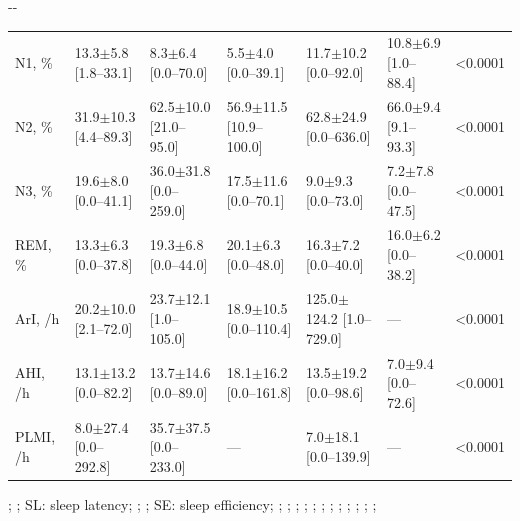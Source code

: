 \begin{landscape}
\begin{table}[tb]
\begin{adjustwidth*}{}{-\marginparwidth-\marginparsep}
\begin{threeparttable}
\begin{tabular}{@{}lllllll@{}}
N1, \%     & 13.3$\pm$5.8 {[}1.8--33.1{]}     & 8.3$\pm$6.4 {[}0.0--70.0{]}      & 5.5$\pm$4.0 {[}0.0--39.1{]}      & 11.7$\pm$10.2 {[}0.0--92.0{]}    & 10.8$\pm$6.9 {[}1.0--88.4{]}     & \num{<0.0001}         \\
N2, \%     & 31.9$\pm$10.3 {[}4.4--89.3{]}    & 62.5$\pm$10.0 {[}21.0--95.0{]}   & 56.9$\pm$11.5 {[}10.9--100.0{]}  & 62.8$\pm$24.9 {[}0.0--636.0{]}   & 66.0$\pm$9.4 {[}9.1--93.3{]}     & \num{<0.0001}         \\
N3, \%     & 19.6$\pm$8.0 {[}0.0--41.1{]}     & 36.0$\pm$31.8 {[}0.0--259.0{]}   & 17.5$\pm$11.6 {[}0.0--70.1{]}    & 9.0$\pm$9.3 {[}0.0--73.0{]}      & 7.2$\pm$7.8 {[}0.0--47.5{]}      & \num{<0.0001}         \\
REM, \%    & 13.3$\pm$6.3 {[}0.0--37.8{]}     & 19.3$\pm$6.8 {[}0.0--44.0{]}     & 20.1$\pm$6.3 {[}0.0--48.0{]}     & 16.3$\pm$7.2 {[}0.0--40.0{]}     & 16.0$\pm$6.2 {[}0.0--38.2{]}     & \num{<0.0001} \\
ArI, /h    & 20.2$\pm$10.0 {[}2.1--72.0{]}    & 23.7$\pm$12.1 {[}1.0--105.0{]}   & 18.9$\pm$10.5 {[}0.0--110.4{]}   & 125.0$\pm$124.2 {[}1.0--729.0{]} & ---       & \num{<0.0001}         \\
AHI, /h    & 13.1$\pm$13.2 {[}0.0--82.2{]}    & 13.7$\pm$14.6 {[}0.0--89.0{]}    & 18.1$\pm$16.2 {[}0.0--161.8{]}   & 13.5$\pm$19.2 {[}0.0--98.6{]}    & 7.0$\pm$9.4 {[}0.0--72.6{]}      & \num{<0.0001}         \\
PLMI, /h   & 8.0$\pm$27.4 {[}0.0--292.8{]}    & 35.7$\pm$37.5 {[}0.0--233.0{]}   & ---       & 7.0$\pm$18.1 {[}0.0--139.9{]}    & ---       & \num{<0.0001} \\ \bottomrule
\end{tabular}
\begin{tablenotes}
\item %
; %
; %
SL: sleep latency; %
; %
; %
SE: sleep efficiency; %
; %
; %
; %
; %
; %
; %
; %
; %
; %
; %
; %
; %
\end{tablenotes}
\end{threeparttable}
\end{adjustwidth*}
\end{table}
\end{landscape}

